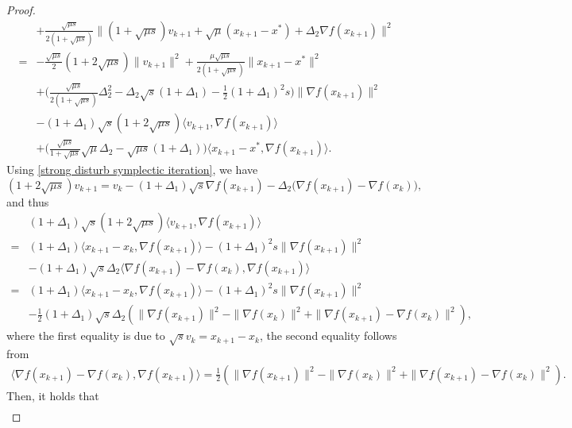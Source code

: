 \documentclass[11pt]{article}
\newcommand{\1}{\mathbf 1}
\numberwithin{equation}{section}
\begin{document}
\begin{proof}
\begin{align*}
            &+\frac{\sqrt{\mu s}}{2(1+\sqrt{\mu s})}\|(1+\sqrt{\mu s})v_{k+1}+\sqrt{\mu}(x_{k+1}-x^*)+\Delta_2\nabla f(x_{k+1})\|^2\\
            =
            &-\frac{\sqrt{\mu s}}{2}(1+2\sqrt{\mu s})\|v_{k+1}\|^2+\frac{\mu\sqrt{\mu s}}{2(1+\sqrt{\mu s})}\|x_{k+1}-x^*\|^2\\
            &+\big(\frac{\sqrt{\mu s}}{2(1+\sqrt{\mu s})}\Delta_2^2-\Delta_2\sqrt{s}(1+\Delta_1)-\frac{1}{2}(1+\Delta_1)^2s\big)\|\nabla f(x_{k+1})\|^2\\
            &-(1+\Delta_1)\sqrt{s}(1+2\sqrt{\mu s})\langle v_{k+1},\nabla f(x_{k+1})\rangle\\
            &+\big(\frac{\sqrt{\mu s}}{1+\sqrt{\mu s}}\sqrt{\mu}\Delta_2-\sqrt{\mu s}(1+\Delta_1)\big)\langle x_{k+1}-x^*, \nabla f(x_{k+1}) \rangle.
    \end{align*}
    Using \eqref{strong disturb symplectic iteration}, we have 
    \begin{equation*}
    (1+2\sqrt{\mu s})v_{k+1}=v_k-(1+\Delta_1)\sqrt{s}\nabla f(x_{k+1})-\Delta_2\big(\nabla f(x_{k+1})-\nabla f(x_k)\big),
    \end{equation*}
    and thus
    \begin{align*}
        &(1+\Delta_1)\sqrt{s}(1+2\sqrt{\mu s})\langle v_{k+1}, \nabla f(x_{k+1}) \rangle\\
        =&(1+\Delta_1)\langle x_{k+1}-x_k, \nabla f(x_{k+1})\rangle -(1+\Delta_1)^2s\|\nabla f(x_{k+1})\|^2\\
        &-(1+\Delta_1)\sqrt{s}\Delta_2\langle \nabla f(x_{k+1})-\nabla f(x_k), \nabla f(x_{k+1})\rangle\\
        =&(1+\Delta_1)\langle x_{k+1}-x_k, \nabla f(x_{k+1})\rangle -(1+\Delta_1)^2s\|\nabla f(x_{k+1})\|^2\\
        &-\frac{1}{2}(1+\Delta_1)\sqrt{s}\Delta_2(\|\nabla f(x_{k+1})\|^2-\|\nabla f(x_k)\|^2+\|\nabla f(x_{k+1})-\nabla f(x_k)\|^2),
    \end{align*}
    where the first equality is due to $\sqrt{s}v_k=x_{k+1}-x_k$, the second equality follows from
    \begin{align*}
        \langle \nabla f(x_{k+1})-\nabla f(x_k), \nabla f(x_{k+1})\rangle=\frac{1}{2}(\|\nabla f(x_{k+1})\|^2-\|\nabla f(x_k)\|^2+\|\nabla f(x_{k+1})-\nabla f(x_k)\|^2).
    \end{align*}
    Then, it holds that
    \begin{equation}
        \label{eq: M1M2 in direct symplectic discretization}
        \begin{aligned}

\end{aligned}
\end{equation}
\end{proof}
\end{document}
